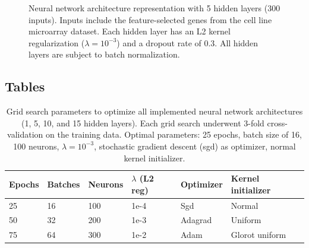 \documentclass[10pt, letterpaper, twocolumn]{article}
\begin{document}
\begin{figure}[ht]
    \caption{Neural network architecture representation with 5 hidden layers (300 inputs). Inputs include the feature-selected genes from the cell line microarray dataset. Each hidden layer has an L2 kernel regularization ($\lambda=10^{-3}$) and a dropout rate of 0.3. All hidden layers are subject to batch normalization.}
    \label{fig:neural_vis}
\end{figure}

\subsection{Tables}
\begin{table}[ht]
    \caption{Grid search parameters to optimize all implemented neural network architectures (1, 5, 10, and 15 hidden layers). Each grid search underwent 3-fold cross-validation on the training data. Optimal parameters: 25 epochs, batch size of 16, 100 neurons, $\lambda=10^{-3}$, stochastic gradient descent (sgd) as optimizer, normal kernel initializer.}
    \centering
    \label{tab:params}
    \begin{tabular}{l l l l l l}
        \toprule
        Epochs & Batches & Neurons & $\lambda$ (L2 reg) & Optimizer & Kernel initializer \\
        \midrule
        25 & 16 & 100 & 1e-4 & Sgd & Normal \\
        50 & 32 & 200 & 1e-3 & Adagrad & Uniform \\
        75 & 64 & 300 & 1e-2 & Adam & Glorot uniform \\
        \bottomrule
    \end{tabular}
\end{table}
\end{document}
